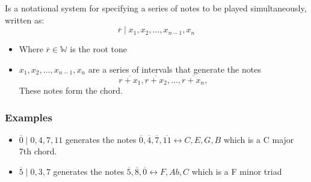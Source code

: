 \documentclass[preview]{standalone}
\begin{document}
\begin{center}
Is a notational system for specifying a series of notes to be played simultaneously, written as:
  \[
	  \overline{r} \mid x_{1} , x_{2} , \dotsc  , x_{n - 1} , x_{n}
  \]
  \begin{itemize}
	\item Where $ \overline{r} \in \mathbb{W}$ is the root tone 
	\item  $ x_{1} , x_{2} , \dotsc  , x_{n - 1} , x_{n}$ are a series of intervals that generate the notes
	  \[
	  \overline{r  +  x_{1}}, \overline{r  +  x_{2}}, \ldots, \overline{r  +  x_{n}}, 
	  \]
	  These notes form the chord.
  \end{itemize}
  \subsubsection*{Examples}
  \begin{itemize}
	\item $ \overline{0} \mid 0, 4, 7, 11$ generates the notes $ \overline{0}, \overline{4}, \overline{7}, \overline{11} \leftrightarrow C, E, G, B$ which is a C major 7th chord.
	\item $ \overline{5} \mid 0, 3, 7$ generates the notes $ \overline{5}, \overline{8}, \overline{0} \leftrightarrow F, Ab, C$ which is a F minor triad
  \end{itemize}
\end{center}
\end{document}
